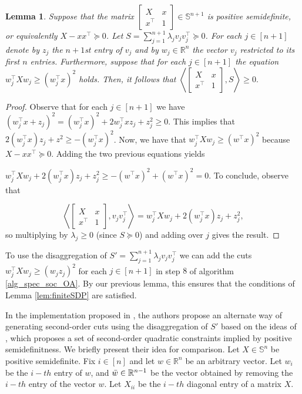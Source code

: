 \documentclass{article}
\newtheorem{lemma}{Lemma}
\begin{document}
\begin{lemma}\label{lem_soc_valid}
Suppose that the matrix $\begin{bmatrix}
X & x \\
x^\top & 1 
\end{bmatrix} \in \mathbb{S}^{n+1} $ is positive semidefinite, or equivalently $X-xx^\top \succeq 0$. Let $S = \sum_{j=1}^{n+1} \lambda_j v_jv_j^\top \succeq 0$. For each $j \in [n+1]$ denote by $z_j$ the $n+1$st entry of $v_j$ and by $w_j \in \mathbb{R}^n$ the vector $v_j$ restricted to its first $n$ entries. Furthermore, suppose that for each $j \in [n+1]$ the equation $
w_j^\top X w_j \geq (w_j^\top x)^2$
holds. Then, it follows that $
\left \langle  \begin{bmatrix}
X & x \\
x^\top & 1 
\end{bmatrix} , S \right \rangle \geq 0.$

\end{lemma}
\begin{proof}

Observe that for each $j \in [n+1]$ we have $
(w_j^\top x + z_j)^2 = (w_j^\top x )^2 + 2w_j^\top x z_j + z_j^2 \geq 0.$
This implies that $2(w_j^\top x)z_j + z^2 \geq -(w_j^\top x)^2$.
Now, we have that $w_j^\top X w_j \geq (w^\top x)^2$ because $X-xx^\top \succeq 0$. Adding the two previous equations yields

$
w_j^\top X w_j + 2(w_j^\top x)z_j + z_j^2 \geq  -(w^\top x)^2 + (w^\top x)^2 = 0.
$
To conclude, observe that

\[
\left \langle  \begin{bmatrix}
X & x \\
x^\top & 1 
\end{bmatrix}   , v_jv_j^\top  \right \rangle = w_j^\top X w_j + 2(w_j^\top x)z_j + z_j^2,
\]
so multiplying by $\lambda_j \geq 0$ (since $S\succeq 0$) and adding over $j$ gives the result.


\end{proof}


To use the disaggregation of $S' =\sum_{j=1}^{n+1} \lambda_j v_jv_j^\top$ we can add the cuts $w_j^\top X w_j \geq (w_jz_j)^2 $ for each $j\in [n+1]$ in step $8$ of algorithm \ref{alg_spec_soc_OA}. By our previous lemma, this ensures that the conditions of Lemma \ref{lem:finiteSDP} are satisfied.


In the implementation proposed in \cite{coey2020outer}, the authors propose an alternate way of generating second-order cuts using the disaggregation of $S'$ based on the ideas of 
\cite{kim2003second}, which proposes a set of second-order quadratic constraints implied by positive semidefinitness. We briefly present their idea for comparison. Let $X \in \mathbb{S}^n$ be positive semidefinite. Fix $i \in [n]$ and let $w \in \mathbb{R}^n$ be an arbitrary vector. Let $w_i$ be the $i-th$ entry of $w$, and $\Bar{w} \in \mathbb{R}^{n-1}$ be the vector obtained by removing the $i-th$ entry of the vector $w$. Let $X_{ii}$ be the $i-th$ diagonal entry of a matrix $X$. 
\end{document}
